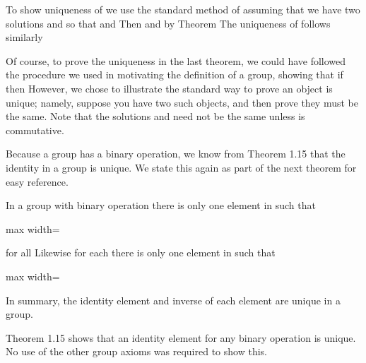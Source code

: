 \documentclass[11pt,oneside]{article}
\begin{document}
\begin{BookBody}
To show uniqueness of  we use the standard method of assuming that we have two solutions and  so that  and  Then  and by Theorem  The uniqueness of  follows similarly\BookEnd{\blacklozenge}

Of course, to prove the uniqueness in the last theorem, we could have followed the procedure we used in motivating the definition of a group, showing that if  then  However, we chose to illustrate the standard way to prove an object is unique; namely, suppose you have two such objects, and then prove they must be the same. Note that the solutions  and  need not be the same unless \BookInline{\ast } is commutative.

Because a group has a binary operation, we know from Theorem 1.15 that the identity  in a group is unique. We state this again as part of the next theorem for easy reference.

 In a group  with binary operation \BookInline{\ast,\allowbreak } there is only one element  in  such that

\begin{center}\begin{adjustbox}{max width=\linewidth}\end{adjustbox}\end{center}

\noindent for all  Likewise for each  there is only one element  in  such that

\begin{center}\begin{adjustbox}{max width=\linewidth}\end{adjustbox}\end{center}

\noindent In summary, the identity element and inverse of each element are unique in a group.

 Theorem 1.15 shows that an identity element for any binary operation is unique. No use of the other group axioms was required to show this.


\end{BookBody}
\end{document}
